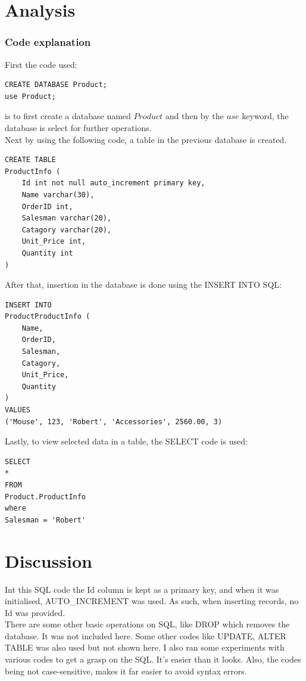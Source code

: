 \documentclass[12pt]{article}
\begin{document}
\section{Analysis}
\subsubsection{Code explanation}
First the code used:
\begin{verbatim}
CREATE DATABASE Product;
use Product;
\end{verbatim}
is to first create a database named $Product$ and then by the $use$ keyword, the database is select for further operations.\\
Next by using the following code, a table in the previous database is created.
\begin{verbatim}
CREATE TABLE
ProductInfo (
    Id int not null auto_increment primary key,
    Name varchar(30),
    OrderID int,
    Salesman varchar(20),
    Catagory varchar(20),
    Unit_Price int,
    Quantity int
)
\end{verbatim}
After that, insertion in the database is done using the INSERT INTO SQL:
\begin{verbatim}
INSERT INTO
ProductProductInfo (
    Name,
    OrderID,
    Salesman,
    Catagory,
    Unit_Price,
    Quantity
)
VALUES
('Mouse', 123, 'Robert', 'Accessories', 2560.00, 3)
\end{verbatim}
Lastly, to view selected data in a table, the SELECT code is used:
\begin{verbatim}
SELECT
*
FROM
Product.ProductInfo
where
Salesman = 'Robert'
\end{verbatim}

\section{Discussion}
Int this SQL code the Id column is kept as a primary key, and when it was initialised, AUTO\_INCREMENT was used. As such, when inserting records, no Id was provided.\\
There are some other basic operations on SQL, like DROP which removes the database. It was not included here. Some other codes like UPDATE, ALTER TABLE was also used but not shown here. I also ran some experiments with various codes to get a grasp on the SQL. It's easier than it looks. Also, the codes being not case-sensitive, makes it far easier to avoid syntax errors.

% 
% 
\end{document}

